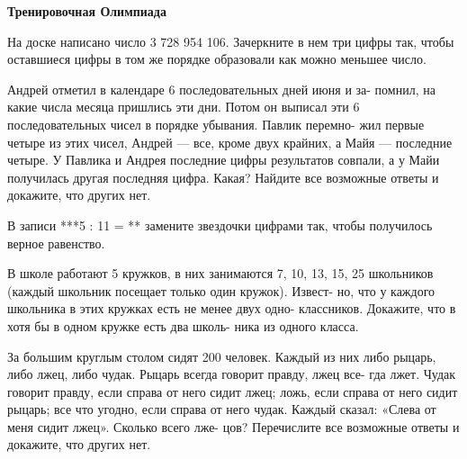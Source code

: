 \hspace{3mm}

\centerline{\bf \Huge Тренировочная Олимпиада}

\hspace{3mm}

 На доске написано число 3 728 954 106. Зачеркните в нем три цифры так, чтобы оставшиеся цифры в том же порядке образовали как можно меньшее число.

\hspace{3mm}

 Андрей отметил в календаре 6 последовательных дней июня и за- помнил, на какие числа месяца пришлись эти дни. Потом он выписал эти 6 последовательных чисел в порядке убывания. Павлик перемно- жил первые четыре из этих чисел, Андрей — все, кроме двух крайних, а Майя — последние четыре. У Павлика и Андрея последние цифры результатов совпали, а у Майи получилась другая последняя цифра. Какая? Найдите все возможные ответы и докажите, что других нет.

\hspace{3mm}

 В записи ***5 : 11 = ** замените звездочки цифрами так, чтобы получилось верное равенство.

\hspace{3mm}

 В школе работают 5 кружков, в них занимаются 7, 10, 13, 15, 25 школьников (каждый школьник посещает только один кружок). Извест- но, что у каждого школьника в этих кружках есть не менее двух одно- классников. Докажите, что в хотя бы в одном кружке есть два школь- ника из одного класса.

\hspace{3mm}

 За большим круглым столом сидят 200 человек. Каждый из них либо рыцарь, либо лжец, либо чудак. Рыцарь всегда говорит правду, лжец все- гда лжет. Чудак говорит правду, если справа от него сидит лжец; ложь, если справа от него сидит рыцарь; все что угодно, если справа от него чудак. Каждый сказал: «Слева от меня сидит лжец». Сколько всего лже- цов? Перечислите все возможные ответы и докажите, что других нет. 